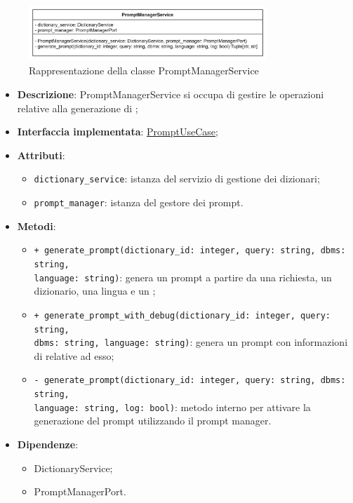  \label{PromptManagementService}
\begin{figure}[H]
    \centering
    \includegraphics[width=0.8\textwidth]{assets/Backend/prompt_manager_service.png}
    \caption{Rappresentazione della classe PromptManagerService}
  \end{figure}
\begin{itemize}
    \item \textbf{Descrizione}: PromptManagerService si occupa di gestire le operazioni relative alla generazione di ;
    \item \textbf{Interfaccia implementata}: \hyperref[PromptUseCase]{PromptUseCase};
    \item \textbf{Attributi}:
    \begin{itemize}
        \item \texttt{dictionary\_service}: istanza del servizio di gestione dei dizionari;
        \item \texttt{prompt\_manager}: istanza del gestore dei prompt.
    \end{itemize}
    \item \textbf{Metodi}:
    \begin{itemize}
        \item \texttt{+ generate\_prompt(dictionary\_id: integer, query: string, dbms: string,\\ language: string)}: genera un prompt a partire da una richiesta, un dizionario, una lingua e un ;
        \item \texttt{+ generate\_prompt\_with\_debug(dictionary\_id: integer, query: string, \\ dbms: string, language: string)}: genera un prompt con informazioni di  relative ad esso;
        \item \texttt{- generate\_prompt(dictionary\_id: integer, query: string, dbms: string,\\ language: string, log: bool)}: metodo interno per attivare la generazione del prompt utilizzando il prompt manager.
    \end{itemize}
    \item \textbf{Dipendenze}:
    \begin{itemize}
        \item DictionaryService;
        \item PromptManagerPort.
    \end{itemize}
\end{itemize}  